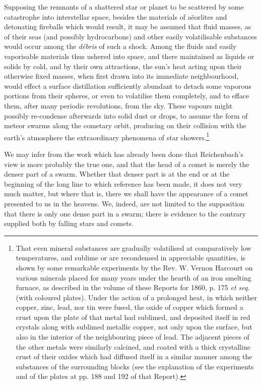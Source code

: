 \documentclass[a4paper, 12pt, oneside, polutonikogreek, english]{article}
\begin{document}
Supposing the remnants of a shattered star or planet to be scattered by some catastrophe into interstellar space, besides the materials of aëorlites and detonating fireballs which would result, it may be assumed that fluid masses, as of their seas (and possibly hydrocarbons) and other easily volatilisable substances would occur among the \emph{débris} of such a shock. Among the fluids and easily vaporisable materials thus ushered into space, and there maintained as liquids or solids by cold, and by their own attractions, the sun's heat acting upon their otherwise fixed masses, when first drawn into its immediate neighbourhood, would effect a surface distillation sufficiently abundant to detach some vaporous portions from their spheres, or even to volatilise them completely, and to efface them, after many periodic revolutions, from the sky. These vapours might possibly re-condense afterwards into solid dust or drops, to assume the form of meteor swarms along the cometary orbit, producing on their collision with the earth's atmosphere the extraordinary phenomena of star showers.\footnote{That even mineral substances are gradually volatilised at comparatively low temperatures, and sublime or are recondensed in appreciable quantities, is shown by some remarkable experiments by the Rev. W. Vernon Harcourt on various minerals placed for many years under the hearth of an iron smelting furnace, as described in the volume of these Reports for 1860, p. 175 \emph{et seq.} (with coloured plates). Under the action of a prolonged heat, in which neither copper, zinc, lead, nor tin were fused, the oxide of copper which formed a crust upon the plate of that metal had sublimed, and deposited itself in red crystals along with sublimed metallic copper, not only upon the surface, but also in the interior of the neighbouring piece of lead. The adjacent pieces of the other metals were similarly calcined, and coated with a thick crystalline crust of their oxides which had diffused itself in a similar manner among the substances of the surrounding blocks (see the explanation of the experiments and of the plates at pp. 188 and 192 of that Report).}

We may infer from the work which has already been done that Reichenbach's view is more probably the true one, and that the head of a comet is merely the denser part of a swarm. Whether that denser part is at the end or at the beginning of the long line to which reference has been made, it does not very much matter, but where that is, there we shall have the appearance of a comet presented to us in the heavens. We, indeed, are not limited to the supposition that there is only one dense part in a swarm; there is evidence to the contrary supplied both by falling stars and comets.
\end{document}
